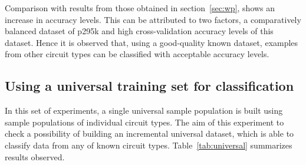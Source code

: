Comparison with results from those obtained in section~\ref{sec:wp}, shows an increase in accuracy levels. This can be attributed to two factors, a comparatively balanced dataset of p295k and high cross-validation accuracy levels of this dataset. Hence it is observed that, using a good-quality known dataset, examples from other circuit types can be classified with acceptable accuracy levels.

\subsection{Using a universal training set for classification}

In this set of experiments, a single universal sample population is built using sample populations of individual circuit types. The aim of this experiment to check a possibility of building an incremental universal dataset, which is able to classify data from any of known circuit types. Table~\ref{tab:universal} summarizes results observed.

